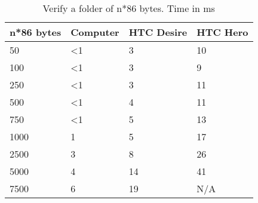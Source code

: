 \begin{table}
  \centering
  \caption{Verify a folder of n*86 bytes. Time in ms}
  \begin{tabular}{ | l | l | l | l |}
    \hline
    \textbf{n*86 bytes} & \textbf{Computer} & \textbf{HTC Desire} & \textbf{HTC Hero} \\ \hline
    50      & <1    &3  & 10    \\ \hline
    100     & <1    &3  &  9    \\ \hline
    250     & <1    &3  & 11    \\ \hline   
    500     & <1    &4  & 11    \\ \hline
    750     & <1    &5  & 13    \\ \hline
    1000    &  1    &5  & 17    \\ \hline
    2500    &  3    &8  & 26    \\ \hline     
    5000    &  4    &14 & 41    \\ \hline 
    7500    &  6    &19 & N/A   \\ \hline 
  \end{tabular}
  \label{tbl:folder:updateexisting}
\end{table}
